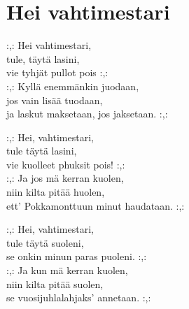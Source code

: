 \section{Hei vahtimestari}

:,: Hei vahtimestari,\\
tule, täytä lasini,\\
vie tyhjät pullot pois :,:\\
:,: Kyllä enemmänkin juodaan,\\
jos vain lisää tuodaan,\\
ja laskut maksetaan, jos jaksetaan. :,:

:,: Hei, vahtimestari,\\
tule täytä lasini,\\
vie kuolleet phuksit pois! :,:\\
:,: Ja jos mä kerran kuolen,\\
niin kilta pitää huolen,\\
ett’ Pokkamonttuun minut haudataan. :,:

:,: Hei, vahtimestari,\\
tule täytä suoleni,\\
se onkin minun paras puoleni. :,:\\
:,: Ja kun mä kerran kuolen,\\
niin kilta pitää suolen,\\
se vuosijuhlalahjaks’ annetaan. :,: